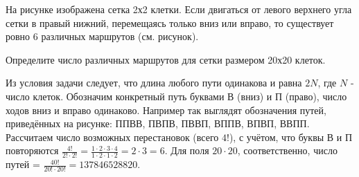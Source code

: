 
На рисунке изображена сетка 2х2 клетки. Если двигаться от левого верхнего угла сетки в правый нижний, перемещаясь только вниз или вправо, то существует ровно 6 различных маршрутов (см. рисунок). 

Определите число различных маршрутов для сетки размером 20х20 клеток. 


\solutionSection

Из условия задачи следует, что длина любого пути одинакова и равна $2N$, где $N$ - число клеток. Обозначим конкретный путь буквами В (вниз) и П (право), число ходов вниз и вправо одинаково. Например так выглядят обозначения путей, приведённых на рисунке: ППВВ, ПВПВ, ПВВП, ВППВ, ВПВП, ВВПП. Рассчитаем число возможных перестановок (всего $4!$), с учётом, что буквы В и П повторяются $\frac{4!}{2!  \cdot  2!} = \frac{1 \cdot 2 \cdot 3 \cdot 4}{1 \cdot 2 \cdot 1 \cdot 2} = 2 \cdot 3 = 6$. Для поля $20 \cdot 20$, соответственно, число путей = $\frac{40!}{20!  \cdot  20!} = 137846528820$.



